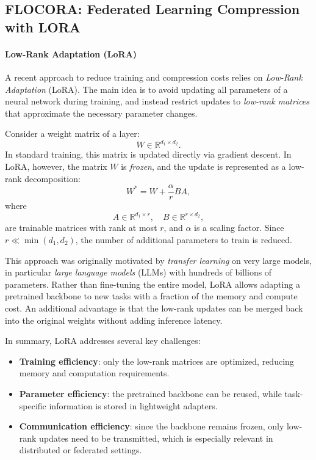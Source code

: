 \documentclass[11pt]{report}
\begin{document}
\subsection{FLOCORA: Federated Learning Compression with LORA}
\paragraph{Low-Rank Adaptation (LoRA)}

A recent approach to reduce training and compression costs relies on \textit{Low-Rank Adaptation} (LoRA). The main idea is to avoid updating all parameters of a neural network during training, and instead restrict updates to \textit{low-rank matrices} that approximate the necessary parameter changes.

Consider a weight matrix of a layer:
\[
  W \in \mathbb{R}^{d_1 \times d_2}.
\]
In standard training, this matrix is updated directly via gradient descent. In LoRA, however, the matrix $W$ is \textit{frozen}, and the update is represented as a low-rank decomposition:
\[
  W^{*} = W + \frac{\alpha}{r} BA,
\]
where
\[
  A \in \mathbb{R}^{d_1 \times r}, \quad B \in \mathbb{R}^{r \times d_2},
\]
are trainable matrices with rank at most $r$, and $\alpha$ is a scaling factor. Since $r \ll \min(d_1, d_2)$, the number of additional parameters to train is reduced.

This approach was originally motivated by \textit{transfer learning} on very large models, in particular \textit{large language models} (LLMs) with hundreds of billions of parameters. Rather than fine-tuning the entire model, LoRA allows adapting a pretrained backbone to new tasks with a fraction of the memory and compute cost. An additional advantage is that the low-rank updates can be merged back into the original weights without adding inference latency.

In summary, LoRA addresses several key challenges:
\begin{itemize}
  \item \textbf{Training efficiency}: only the low-rank matrices are optimized, reducing memory and computation requirements.
  \item \textbf{Parameter efficiency}: the pretrained backbone can be reused, while task-specific information is stored in lightweight adapters.
  \item \textbf{Communication efficiency}: since the backbone remains frozen, only low-rank updates need to be transmitted, which is especially relevant in distributed or federated settings.
\end{itemize}
\end{document}
